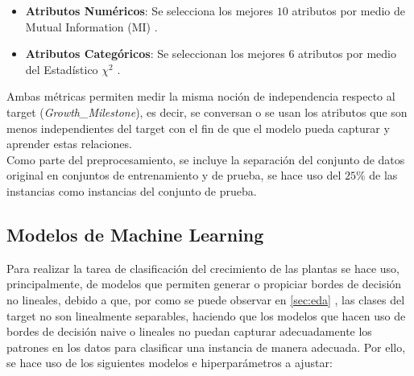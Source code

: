 \documentclass[12pt,a4paper]{article}
\begin{document}
{{            \begin{itemize}
                \item \textbf{Atributos Numéricos}: Se selecciona los mejores $10$ atributos por 
                medio de Mutual Information (MI) \cite{sklearn_mutual_info}.
                \item \textbf{Atributos Categóricos}: Se seleccionan los mejores $6$ atributos por 
                medio del Estadístico $\chi^2$ \cite{sklearn_chi2}.
            \end{itemize}

            Ambas métricas permiten medir la misma noción de independencia respecto al target 
            (\emph{Growth\_Milestone}), es decir, se conversan o se usan los atributos que 
            son menos independientes del target con el fin de que el modelo pueda capturar 
            y aprender estas relaciones.\\

            Como parte del preprocesamiento, se incluye la separación del conjunto de datos original 
            en conjuntos de entrenamiento y de prueba, se hace uso del $25\%$ de las instancias como 
            instancias del conjunto de prueba.
        }
        
        \subsection{Modelos de Machine Learning}
        {
            Para realizar la tarea de clasificación del crecimiento de las plantas se hace uso, 
            principalmente, de modelos que permiten generar o propiciar bordes de decisión no 
            lineales, debido a que, por como se puede observar en \ref{sec:eda} , 
            las clases del target no son linealmente separables, haciendo que los modelos que hacen 
            uso de bordes de decisión naive o lineales no puedan capturar adecuadamente los patrones 
            en los datos para clasificar una instancia de manera adecuada. Por ello, se hace uso de 
            los siguientes modelos e hiperparámetros a ajustar:\\

}}
\end{document}
